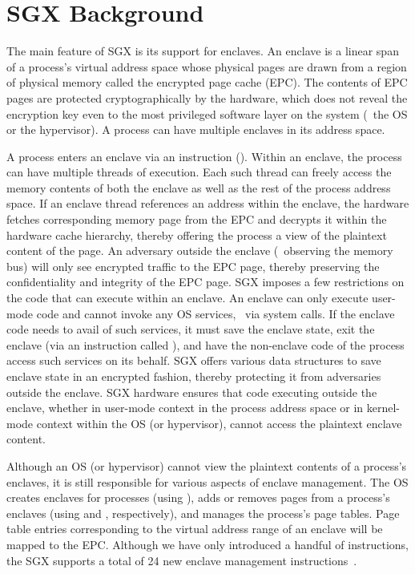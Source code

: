 \section{SGX Background}
\label{section:background}

%
The main feature of SGX is its support for enclaves. An enclave is a linear
span of a process's virtual address space whose physical pages are drawn from a
region of physical memory called the encrypted page cache (EPC). The contents
of EPC pages are protected cryptographically by the hardware, which does not
reveal the encryption key even to the most privileged software layer on the
system (\eg~the OS or the hypervisor). A process can have multiple enclaves in
its address space.

A process enters an enclave via an instruction (). Within an
enclave, the process can have multiple threads of execution. Each such thread
can freely access the memory contents of both the enclave as well as the rest
of the process address space. If an enclave thread references an address within
the enclave, the hardware fetches corresponding memory page from the EPC and
decrypts it within the hardware cache hierarchy, thereby offering the process a
view of the plaintext content of the page.  An adversary outside the enclave
(\eg~observing the memory bus) will only see encrypted traffic to the EPC page,
thereby preserving the confidentiality and integrity of the EPC page.  SGX
imposes a few restrictions on the code that can execute within an enclave. An
enclave can only execute user-mode code and cannot invoke any OS services,
\eg~via system calls. If the enclave code needs to avail of such services, it
must save the enclave state, exit the enclave (via an instruction called
), and have the non-enclave code of the process access such
services on its behalf. SGX offers various data structures to save enclave
state in an encrypted fashion, thereby protecting it from adversaries outside
the enclave. SGX hardware ensures that code executing outside the enclave,
whether in user-mode context in the process address space or in kernel-mode
context within the OS (or hypervisor), cannot access the plaintext enclave 
content.

Although an OS (or hypervisor) cannot view the plaintext contents of a
process's enclaves, it is still responsible for various aspects of enclave
management. The OS creates enclaves for processes (using ), adds
or removes pages from a process's enclaves (using  and
, respectively), and manages the process's page tables. Page
table entries corresponding to the virtual address range of an enclave will be
mapped to the EPC. Although we have only introduced a handful of instructions,
the SGX supports a total of 24 new enclave management
instructions~\cite{intelsgx:sep13,intelsgx:oct14}.

